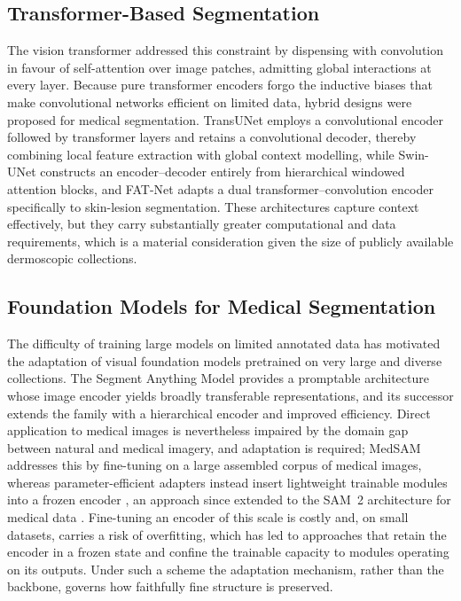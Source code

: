 \subsection{Transformer-Based Segmentation}

The vision transformer \cite{ref7} addressed this constraint by dispensing with convolution in favour of self-attention over image patches, admitting global interactions at every layer. Because pure transformer encoders forgo the inductive biases that make convolutional networks efficient on limited data, hybrid designs were proposed for medical segmentation. TransUNet \cite{ref8} employs a convolutional encoder followed by transformer layers and retains a convolutional decoder, thereby combining local feature extraction with global context modelling, while Swin-UNet \cite{ref18} constructs an encoder--decoder entirely from hierarchical windowed attention blocks, and FAT-Net \cite{ref24} adapts a dual transformer--convolution encoder specifically to skin-lesion segmentation. These architectures capture context effectively, but they carry substantially greater computational and data requirements, which is a material consideration given the size of publicly available dermoscopic collections.

\subsection{Foundation Models for Medical Segmentation}

The difficulty of training large models on limited annotated data has motivated the adaptation of visual foundation models pretrained on very large and diverse collections. The Segment Anything Model \cite{ref9} provides a promptable architecture whose image encoder yields broadly transferable representations, and its successor \cite{ref10} extends the family with a hierarchical encoder and improved efficiency. Direct application to medical images is nevertheless impaired by the domain gap between natural and medical imagery, and adaptation is required; MedSAM \cite{ref11} addresses this by fine-tuning on a large assembled corpus of medical images, whereas parameter-efficient adapters instead insert lightweight trainable modules into a frozen encoder \cite{ref25}, an approach since extended to the SAM~2 architecture for medical data \cite{ref26}. Fine-tuning an encoder of this scale is costly and, on small datasets, carries a risk of overfitting, which has led to approaches that retain the encoder in a frozen state and confine the trainable capacity to modules operating on its outputs. Under such a scheme the adaptation mechanism, rather than the backbone, governs how faithfully fine structure is preserved.

